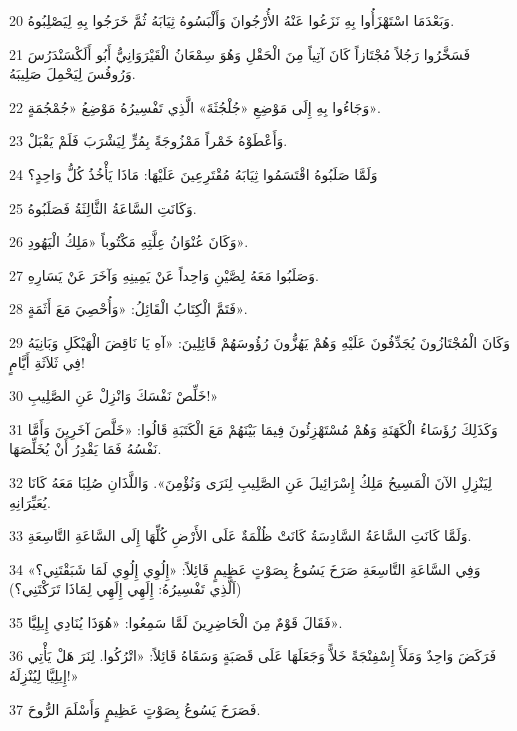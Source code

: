\par 20 وَبَعْدَمَا اسْتَهْزَأُوا بِهِ نَزَعُوا عَنْهُ الأُرْجُوانَ وَأَلْبَسُوهُ ثِيَابَهُ ثُمَّ خَرَجُوا بِهِ لِيَصْلِبُوهُ.
\par 21 فَسَخَّرُوا رَجُلاً مُجْتَازاً كَانَ آتِياً مِنَ الْحَقْلِ وَهُوَ سِمْعَانُ الْقَيْرَوَانِيُّ أَبُو أَلَكْسَنْدَرُسَ وَرُوفُسَ لِيَحْمِلَ صَلِيبَهُ.
\par 22 وَجَاءُوا بِهِ إِلَى مَوْضِعِ «جُلْجُثَةَ» الَّذِي تَفْسِيرُهُ مَوْضِعُ «جُمْجُمَةٍ».
\par 23 وَأَعْطَوْهُ خَمْراً مَمْزُوجَةً بِمُرٍّ لِيَشْرَبَ فَلَمْ يَقْبَلْ.
\par 24 وَلَمَّا صَلَبُوهُ اقْتَسَمُوا ثِيَابَهُ مُقْتَرِعِينَ عَلَيْهَا: مَاذَا يَأْخُذُ كُلُّ وَاحِدٍ؟
\par 25 وَكَانَتِ السَّاعَةُ الثَّالِثَةُ فَصَلَبُوهُ.
\par 26 وَكَانَ عُنْوَانُ عِلَّتِهِ مَكْتُوباً «مَلِكُ الْيَهُودِ».
\par 27 وَصَلَبُوا مَعَهُ لِصَّيْنِ وَاحِداً عَنْ يَمِينِهِ وَآخَرَ عَنْ يَسَارِهِ.
\par 28 فَتَمَّ الْكِتَابُ الْقَائِلُ: «وَأُحْصِيَ مَعَ أَثَمَةٍ».
\par 29 وَكَانَ الْمُجْتَازُونَ يُجَدِّفُونَ عَلَيْهِ وَهُمْ يَهُزُّونَ رُؤُوسَهُمْ قَائِلِينَ: «آهِ يَا نَاقِضَ الْهَيْكَلِ وَبَانِيَهُ فِي ثَلاَثَةِ أَيَّامٍ!
\par 30 خَلِّصْ نَفْسَكَ وَانْزِلْ عَنِ الصَّلِيبِ!»
\par 31 وَكَذَلِكَ رُؤَسَاءُ الْكَهَنَةِ وَهُمْ مُسْتَهْزِئُونَ فِيمَا بَيْنَهُمْ مَعَ الْكَتَبَةِ قَالُوا: «خَلَّصَ آخَرِينَ وَأَمَّا نَفْسُهُ فَمَا يَقْدِرُ أَنْ يُخَلِّصَهَا.
\par 32 لِيَنْزِلِ الآنَ الْمَسِيحُ مَلِكُ إِسْرَائِيلَ عَنِ الصَّلِيبِ لِنَرَى وَنُؤْمِنَ». وَاللَّذَانِ صُلِبَا مَعَهُ كَانَا يُعَيِّرَانِهِ.
\par 33 وَلَمَّا كَانَتِ السَّاعَةُ السَّادِسَةُ كَانَتْ ظُلْمَةٌ عَلَى الأَرْضِ كُلِّهَا إِلَى السَّاعَةِ التَّاسِعَةِ.
\par 34 وَفِي السَّاعَةِ التَّاسِعَةِ صَرَخَ يَسُوعُ بِصَوْتٍ عَظِيمٍ قَائِلاً: «إِلُوِي إِلُوِي لَمَا شَبَقْتَنِي؟» (اَلَّذِي تَفْسِيرُهُ: إِلَهِي إِلَهِي لِمَاذَا تَرَكْتَنِي؟)
\par 35 فَقَالَ قَوْمٌ مِنَ الْحَاضِرِينَ لَمَّا سَمِعُوا: «هُوَذَا يُنَادِي إِيلِيَّا».
\par 36 فَرَكَضَ وَاحِدٌ وَمَلَأَ إِسْفِنْجَةً خَلاًّ وَجَعَلَهَا عَلَى قَصَبَةٍ وَسَقَاهُ قَائِلاً: «اتْرُكُوا. لِنَرَ هَلْ يَأْتِي إِيلِيَّا لِيُنْزِلَهُ!»
\par 37 فَصَرَخَ يَسُوعُ بِصَوْتٍ عَظِيمٍ وَأَسْلَمَ الرُّوحَ.
